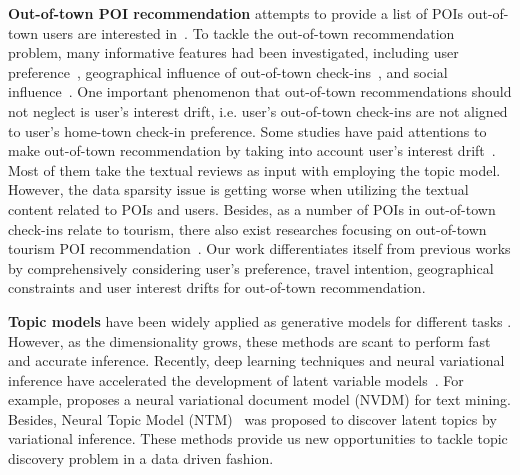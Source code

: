 \documentclass[letterpaper]{article} %
\begin{document}
{\bf{Out-of-town POI recommendation}}
attempts to provide a list of POIs out-of-town users are interested in~\cite{wang2017location}. 
To tackle the out-of-town recommendation problem, many informative features had been investigated, including user preference~\cite{ference2013location}, geographical influence of out-of-town check-ins~\cite{ference2013location,pham2017general}, and social influence~\cite{ference2013location}.
One important phenomenon that out-of-town recommendations should not neglect is user's interest drift, i.e. user's out-of-town check-ins are not aligned to user's home-town check-in preference. 
Some studies have paid attentions to make out-of-town recommendation by taking into account user's interest drift~\cite{yin2014lcars,yin2016joint,wang2017location}. 
Most of them take the textual reviews as input with employing the topic model. 
However, the data sparsity issue is getting worse when utilizing the textual content related to POIs and users.
Besides, as a number of POIs in out-of-town check-ins relate to tourism, there also exist researches focusing on out-of-town tourism POI recommendation~\cite{liu2011personalized,brilhante2013shall,hu2017unifying}. 
Our work differentiates itself from previous works by comprehensively considering user's preference, travel intention, geographical constraints and user interest drifts for out-of-town recommendation.

{\bf{Topic models}}
% 
have been widely applied as generative models for different tasks \cite{wang2017location,xu2017measuring,shen2018joint,zhou2019topic,luo2020spatial}.
However, as the dimensionality grows, these methods are scant to perform fast and accurate inference. %
Recently, deep learning techniques and neural variational inference have accelerated the development of latent variable models~\cite{miao2016neural,miao2017discovering,kingma2013auto,srivastava2017autoencoding}. 
For example, \cite{miao2016neural} proposes a neural variational document model (NVDM) for text mining. 
Besides, Neural Topic Model (NTM)~\cite{miao2017discovering} was proposed to discover latent topics by variational inference. 
These methods provide us new opportunities to tackle topic discovery problem in a data driven fashion.
\end{document}
